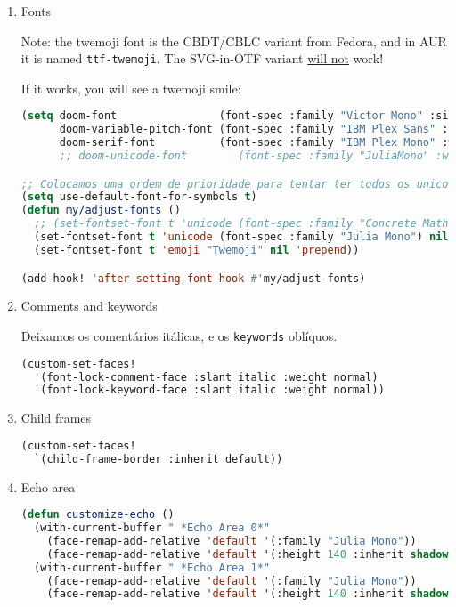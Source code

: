 \documentclass[11pt]{article}
\begin{document}
\begin{enumerate}
  \item Fonts
  \label{sec:fonts}

  Note: the twemoji font is the CBDT/CBLC variant from Fedora, and in AUR it is named \texttt{ttf-twemoji}. The SVG-in-OTF variant \uline{will not} work!

If it works, you will see a twemoji smile: 🙂

\begin{lstlisting}[language=Lisp]
(setq doom-font                (font-spec :family "Victor Mono" :size 19 :weight 'medium)
      doom-variable-pitch-font (font-spec :family "IBM Plex Sans" :size 19 :weight 'normal)
      doom-serif-font          (font-spec :family "IBM Plex Mono" :weight 'light))
      ;; doom-unicode-font        (font-spec :family "JuliaMono" :weight 'normal))

;; Colocamos uma ordem de prioridade para tentar ter todos os unicodes e emojis.
(setq use-default-font-for-symbols t)
(defun my/adjust-fonts ()
  ;; (set-fontset-font t 'unicode (font-spec :family "Concrete Math"))
  (set-fontset-font t 'unicode (font-spec :family "Julia Mono") nil 'append)
  (set-fontset-font t 'emoji "Twemoji" nil 'prepend))

(add-hook! 'after-setting-font-hook #'my/adjust-fonts)
\end{lstlisting}
  \item Comments and keywords
  \label{sec:comments-and-keywords}

  Deixamos os comentários itálicas, e os \lstinline|keywords| oblíquos.

\begin{lstlisting}[language=Lisp]
(custom-set-faces!
  '(font-lock-comment-face :slant italic :weight normal)
  '(font-lock-keyword-face :slant italic :weight normal))
\end{lstlisting}
  \item Child frames
  \label{sec:child-frames}

  \begin{lstlisting}[language=Lisp]
(custom-set-faces!
  `(child-frame-border :inherit default))
\end{lstlisting}
  \item Echo area
  \label{sec:echo-area}

  \begin{lstlisting}[language=Lisp]
(defun customize-echo ()
  (with-current-buffer " *Echo Area 0*"
    (face-remap-add-relative 'default '(:family "Julia Mono"))
    (face-remap-add-relative 'default '(:height 140 :inherit shadow)))
  (with-current-buffer " *Echo Area 1*"
    (face-remap-add-relative 'default '(:family "Julia Mono"))
    (face-remap-add-relative 'default '(:height 140 :inherit shadow))))


\end{lstlisting}
\end{enumerate}
\end{document}
